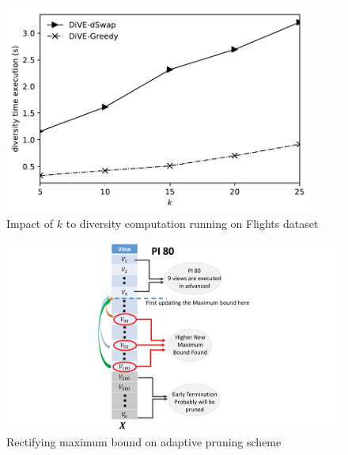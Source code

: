 \documentclass{article}
\begin{document}
\begin{figure}
	\begin{center}
		\includegraphics[width=4.0in]{figures/impact_of_k_to_diversity_cost}
		\vspace{-12pt}
		\caption{Impact of $k$ to diversity computation running on Flights dataset}
		\label{fig:impact-of-k-diversity-computation}
		
	\end{center}
\end{figure}



\begin{figure}
	\begin{center}
		\includegraphics[width=7.0in]{figures/rectifying_bound_2}
		\vspace{-8pt}
		\caption{Rectifying maximum bound on adaptive pruning scheme}
		\label{fig:rectifying_bound_2}
		
	\end{center}
\end{figure}


\end{document}
